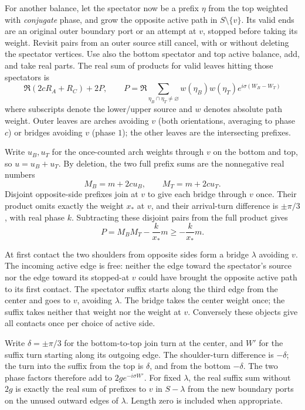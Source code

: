 For another balance, let the spectator now be a prefix $\eta$ from the
top weighted with \emph{conjugate} phase, and grow the opposite active
path in $S\setminus\{v\}$. Its valid ends are an original outer
boundary port or an attempt at $v$, stopped before taking its weight.
Revisit pairs from an outer source still cancel, with or without
deleting the spectator vertices. Use also the bottom spectator and top
active balance, add, and take real parts. The real sum of products for
valid leaves hitting those spectators is
\[
 \Re(2c R_A+R_C)+2P,\qquad
 P=\Re\!\!\sum_{\eta_B\cap\eta_T\ne\varnothing}
 w(\eta_B) w(\eta_T) e^{i\sigma(W_B-W_T)}
\]
where subscripts denote the lower/upper source and $w$ denotes absolute
path weight. Outer leaves are arches avoiding $v$ (both orientations,
averaging to phase $c$) or bridges avoiding $v$ (phase $1$); the other
leaves are the intersecting prefixes.

Write $u_B,u_T$ for the once-counted arch weights through $v$ on the
bottom and top, so $u=u_B+u_T$. By deletion, the two full prefix sums
are the nonnegative real numbers
\[
 M_B=m+2cu_B,\qquad M_T=m+2cu_T.
\]
Disjoint opposite-side prefixes join at $v$ to give each bridge through
$v$ once. Their product omits exactly the weight $x_*$ at $v$, and
their arrival-turn difference is $\pm\pi/3$, with real phase $k$.
Subtracting these disjoint pairs from the full product gives
\begin{equation}\label{eq:pv:prefix-product}
 P=M_BM_T-\frac{k}{x_*}m\ge-\frac{k}{x_*}m.
\end{equation}

At first contact the two shoulders from opposite sides form a bridge
$\lambda$ avoiding $v$. The incoming active edge is free: neither the
edge toward the spectator's source nor the edge toward its stopped-at
$v$ could have brought the opposite active path to its first contact.
The spectator suffix starts along the third edge from the center and
goes to $v$, avoiding $\lambda$. The bridge takes the center weight
once; the suffix takes neither that weight nor the weight at $v$.
Conversely these objects give all contacts once per choice of active
side.

Write $\delta=\pm\pi/3$ for the bottom-to-top join turn at the center,
and $W'$ for the suffix turn starting along its outgoing edge. The
shoulder-turn difference is $-\delta$; the turn into the suffix from
the top is $\delta$, and from the bottom $-\delta$. The two phase
factors therefore add to $2g e^{-i\sigma W'}$. For fixed $\lambda$,
the real suffix sum without $2g$ is exactly the real sum of prefixes
to $v$ in $S-\lambda$ from the new boundary ports on the unused
outward edges of $\lambda$. Length zero is included when appropriate.

